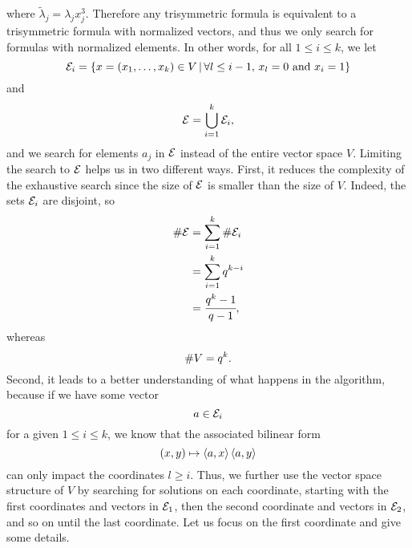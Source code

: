 where $\widetilde\lambda_j = \lambda_jx_j^3$.
Therefore any trisymmetric formula is equivalent to a trisymmetric formula with
normalized vectors, and thus we only search for formulas with normalized
elements. In other words, for all $1\leq i\leq k$, we let
\[
  \mathcal{E}_i=\left\{ x=(x_1, \dots, x_k)\in V
  \,|\, \forall l\leq i-1,\,x_l=0\text{ and }x_i=1 \right\}
\]
and
\[
  \mathcal{E} = \bigcup_{i=1}^k\mathcal{E}_i,
\]
and we search for elements $a_j$ in $\mathcal{E}$ instead of the entire vector space $V$.
Limiting the search to $\mathcal{E}$ helps us in two different ways. First, it reduces
the complexity of the exhaustive search since the size of $\mathcal{E}$ is smaller
than the size of $V$. Indeed, the sets $\mathcal{E}_i$ are disjoint, so
\begin{align*}
  \#\mathcal{E} &= \sum_{i=1}^k\#\mathcal{E}_i\\
  &= \sum_{i=1}^k q^{k-i}\\
  &= \cfrac{q^k-1}{q-1},
\end{align*}
whereas
\[
  \# V = q^k.
\]
Second, it leads to a better understanding of what happens in the algorithm,
because if we have some vector
\[
  a\in\mathcal{E}_i
\]
for a given $1\leq i\leq k$, we know that the associated bilinear form
\[
  (x, y)\mapsto\left\langle a,x\right\rangle\left\langle a,y\right\rangle
\]
can only impact the coordinates $l\geq i$. Thus, we further
use the vector space structure of $V$ by searching for solutions
on each coordinate, starting with the first coordinates and vectors in $\mathcal{E}_1$,
then the second coordinate and vectors in $\mathcal{E}_2$, and so on until the last
coordinate. Let us focus on the first coordinate and give some details.


